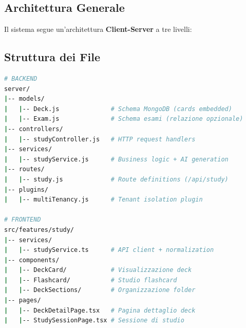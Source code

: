 \documentclass[11pt,a4paper]{article}
\begin{document}
\subsection{Architettura Generale}

Il sistema segue un'architettura \textbf{Client-Server} a tre livelli:

\begin{center}
\end{center}

\subsection{Struttura dei File}

\begin{lstlisting}[language=bash, caption={Struttura file componente Deck/Flashcard}]
# BACKEND
server/
|-- models/
|   |-- Deck.js              # Schema MongoDB (cards embedded)
|   |-- Exam.js              # Schema esami (relazione opzionale)
|-- controllers/
|   |-- studyController.js   # HTTP request handlers
|-- services/
|   |-- studyService.js      # Business logic + AI generation
|-- routes/
|   |-- study.js             # Route definitions (/api/study)
|-- plugins/
|   |-- multiTenancy.js      # Tenant isolation plugin

# FRONTEND
src/features/study/
|-- services/
|   |-- studyService.ts      # API client + normalization
|-- components/
|   |-- DeckCard/            # Visualizzazione deck
|   |-- Flashcard/           # Studio flashcard
|   |-- DeckSections/        # Organizzazione folder
|-- pages/
|   |-- DeckDetailPage.tsx   # Pagina dettaglio deck
|   |-- StudySessionPage.tsx # Sessione di studio
\end{lstlisting}
\end{document}
